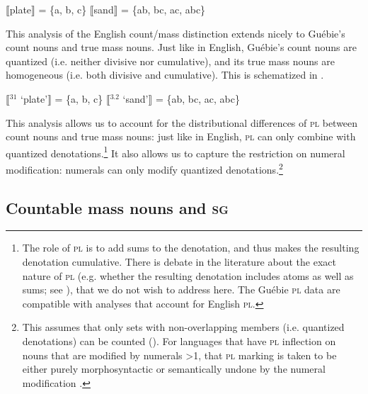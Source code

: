 \documentclass[output=paper,colorlinks,citecolor=brown]{langscibook}
\begin{document}
\ea%
    \label{ex:sande:17}
    \ea%
    \label{ex:sande:17a}
    $\llbracket$plate$\rrbracket$ = \{a, b, c\}
    \ex%
    \label{ex:sande:17b}
    $\llbracket$sand$\rrbracket$ = \{ab, bc, ac, abc\}
    \z
\z

This analysis of the English count/mass distinction extends nicely to Guébie's count nouns and true mass nouns. Just like in English, Guébie's count nouns are quantized (i.e. neither divisive nor cumulative), and its true mass nouns are homogeneous (i.e. both divisive and cumulative). This is schematized in .

\ea%
    \label{ex:sande:18}
    \ea%
    \label{ex:sande:18a}
    $\llbracket$$^{31}$ `plate'$\rrbracket$ = \{a, b, c\}
    \ex%
    \label{ex:sande:18b}
    $\llbracket$$^{3.2}$ `sand'$\rrbracket$ = \{ab, bc, ac, abc\}
    \z
\z

This analysis allows us to account for the distributional differences of \textsc{pl} between count nouns and true mass nouns: just like in English, \textsc{pl} can only combine with quantized denotations.\footnote{The role of \textsc{pl} is to add sums to the denotation, and thus makes the resulting denotation cumulative. There is debate in the literature about the exact nature of \textsc{pl} (e.g. whether the resulting denotation includes atoms as well as sums; see \citealt{SauerlandEtAl2005, FarkasSwart2010}), that we do not wish to address here. The Guébie \textsc{pl} data are compatible with analyses that account for English \textsc{pl}.} It also allows us to capture the restriction on numeral modification: numerals can only modify quantized denotations.\footnote{This assumes that only sets with non-overlapping members (i.e. quantized denotations) can be counted (\citealt{Chierchia1998, Landman2011}). For languages that have \textsc{pl} inflection on nouns that are modified by numerals >1, that \textsc{pl} marking is taken to be either purely morphosyntactic \citep{Krifka1989} or semantically undone by the numeral modification \citep{Chierchia1998}.}


\subsection{Countable mass nouns and \textsc{sg}}\label{sec:sande:3.2}
\end{document}
